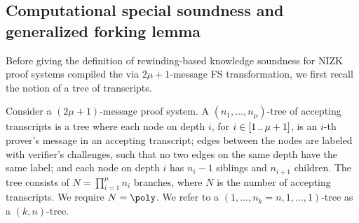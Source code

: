 \subsection{Computational special soundness and generalized forking lemma}

Before giving the definition of rewinding-based knowledge soundness for NIZK proof systems compiled the via $2\mu + 1$-message FS transformation, we first recall the notion of a tree of transcripts.
\begin{definition}
	\label{def:tree_of_accepting_transcripts}
	Consider a $(2\mu + 1)$-message proof system.  A $(n_1,
  \ldots, n_\mu)$-tree of accepting transcripts is a tree where each node on
  depth $i$, for $i \in [1 \, .. \, \mu + 1]$, is an $i$-th prover's message in an
  accepting transcript; edges between the nodes are labeled with verifier's
  challenges, such that no two edges on the same depth have the same
  label; and each node on depth $i$ has $n_{i} - 1$ siblings and $n_{i +
    1}$ children. The tree consists of $N = \prod_{i = 1}^\mu n_i$
  branches, where $N$ is the number of accepting transcripts. We require $N = \poly$. We refer to a $(1, \ldots, n_k=n, 1, \ldots, 1)$-tree as a $(k,n)$-tree.
\end{definition}
 

\iffalse
		
